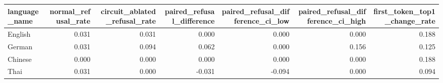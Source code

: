 \begin{tabular}{lrrrrrr}
\toprule
language\_name & normal\_refusal\_rate & circuit\_ablated\_refusal\_rate & paired\_refusal\_difference & paired\_refusal\_difference\_ci\_low & paired\_refusal\_difference\_ci\_high & first\_token\_top1\_change\_rate \\
\midrule
English & 0.031 & 0.031 & 0.000 & 0.000 & 0.000 & 0.188 \\
German & 0.031 & 0.094 & 0.062 & 0.000 & 0.156 & 0.125 \\
Chinese & 0.000 & 0.000 & 0.000 & 0.000 & 0.000 & 0.188 \\
Thai & 0.031 & 0.000 & -0.031 & -0.094 & 0.000 & 0.094 \\
\bottomrule
\end{tabular}
